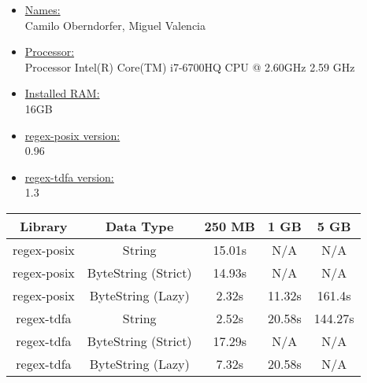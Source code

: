 \documentclass{article}
\begin{document}
\begin{itemize}
    \item \underline{Names:} \\ Camilo Oberndorfer, Miguel Valencia
    \item \underline{Processor:} \\Processor	Intel(R) Core(TM) i7-6700HQ CPU @ 2.60GHz   2.59 GHz
    \item \underline{Installed RAM:} \\ 16GB
    \item \underline{regex-posix version:} \\ 0.96
    \item \underline{regex-tdfa version:} \\ 1.3
\end{itemize}


 \begin{tabular}{||c c c c c||} 
 \hline
 Library & Data Type & 250 MB & 1 GB & 5 GB \\ [0.5ex] 
 \hline\hline
 regex-posix & String & 15.01s & N/A & N/A \\ 
 \hline
 regex-posix & ByteString (Strict) & 14.93s & N/A & N/A \\
 \hline
 regex-posix & ByteString (Lazy) & 2.32s & 11.32s & 161.4s \\
 \hline
 regex-tdfa & String & 2.52s & 20.58s & 144.27s \\
 \hline
 regex-tdfa & ByteString (Strict) & 17.29s & N/A & N/A  \\ [1ex] 
 \hline
 regex-tdfa & ByteString (Lazy) & 7.32s & 20.58s & N/A\\ [1ex] 
 \hline
\end{tabular}
\end{document}
